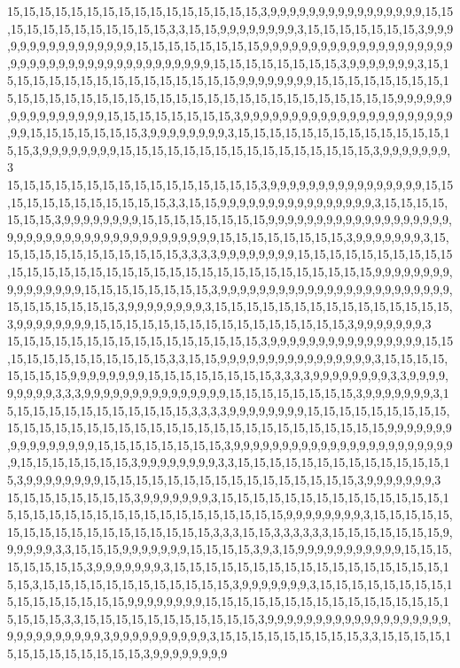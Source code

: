 15,15,15,15,15,15,15,15,15,15,15,15,15,15,15,15,3,9,9,9,9,9,9,9,9,9,9,9,9,9,9,9,9,15,15,15,15,15,15,15,15,15,15,15,15,3,3,15,15,9,9,9,9,9,9,9,9,3,15,15,15,15,15,15,15,3,9,9,9,9,9,9,9,9,9,9,9,9,9,9,9,9,15,15,15,15,15,15,15,15,9,9,9,9,9,9,9,9,9,9,9,9,9,9,9,9,9,9,9,9,9,9,9,9,9,9,9,9,9,9,9,9,9,9,9,9,9,9,9,9,9,15,15,15,15,15,15,15,15,3,9,9,9,9,9,9,9,3,15,15,15,15,15,15,15,15,15,15,15,15,15,15,15,15,9,9,9,9,9,9,9,9,15,15,15,15,15,15,15,15,15,15,15,15,15,15,15,15,15,15,15,15,15,15,15,15,15,15,15,15,15,15,15,15,15,9,9,9,9,9,9,9,9,9,9,9,9,9,9,9,9,15,15,15,15,15,15,15,15,3,9,9,9,9,9,9,9,9,9,9,9,9,9,9,9,9,9,9,9,9,9,9,9,9,15,15,15,15,15,15,15,3,9,9,9,9,9,9,9,9,3,15,15,15,15,15,15,15,15,15,15,15,15,15,15,15,3,9,9,9,9,9,9,9,9,15,15,15,15,15,15,15,15,15,15,15,15,15,15,15,15,3,9,9,9,9,9,9,9,3
15,15,15,15,15,15,15,15,15,15,15,15,15,15,15,15,3,9,9,9,9,9,9,9,9,9,9,9,9,9,9,9,9,15,15,15,15,15,15,15,15,15,15,15,15,3,3,15,15,9,9,9,9,9,9,9,9,9,9,9,9,9,9,9,9,3,15,15,15,15,15,15,15,3,9,9,9,9,9,9,9,9,15,15,15,15,15,15,15,15,9,9,9,9,9,9,9,9,9,9,9,9,9,9,9,9,9,9,9,9,9,9,9,9,9,9,9,9,9,9,9,9,9,9,9,9,9,9,9,9,9,15,15,15,15,15,15,15,15,3,9,9,9,9,9,9,9,3,15,15,15,15,15,15,15,15,15,15,15,15,3,3,3,3,9,9,9,9,9,9,9,9,15,15,15,15,15,15,15,15,15,15,15,15,15,15,15,15,15,15,15,15,15,15,15,15,15,15,15,15,15,15,15,15,15,9,9,9,9,9,9,9,9,9,9,9,9,9,9,9,9,15,15,15,15,15,15,15,15,3,9,9,9,9,9,9,9,9,9,9,9,9,9,9,9,9,9,9,9,9,9,9,9,9,15,15,15,15,15,15,15,3,9,9,9,9,9,9,9,9,3,15,15,15,15,15,15,15,15,15,15,15,15,15,15,15,3,9,9,9,9,9,9,9,9,15,15,15,15,15,15,15,15,15,15,15,15,15,15,15,15,3,9,9,9,9,9,9,9,3
15,15,15,15,15,15,15,15,15,15,15,15,15,15,15,15,3,9,9,9,9,9,9,9,9,9,9,9,9,9,9,9,9,15,15,15,15,15,15,15,15,15,15,15,15,3,3,15,15,9,9,9,9,9,9,9,9,9,9,9,9,9,9,9,9,3,15,15,15,15,15,15,15,15,9,9,9,9,9,9,9,9,15,15,15,15,15,15,15,15,3,3,3,3,9,9,9,9,9,9,9,9,3,3,9,9,9,9,9,9,9,9,9,3,3,3,9,9,9,9,9,9,9,9,9,9,9,9,9,9,9,15,15,15,15,15,15,15,15,3,9,9,9,9,9,9,9,3,15,15,15,15,15,15,15,15,15,15,15,15,3,3,3,3,9,9,9,9,9,9,9,9,15,15,15,15,15,15,15,15,15,15,15,15,15,15,15,15,15,15,15,15,15,15,15,15,15,15,15,15,15,15,15,15,15,9,9,9,9,9,9,9,9,9,9,9,9,9,9,9,9,15,15,15,15,15,15,15,15,3,9,9,9,9,9,9,9,9,9,9,9,9,9,9,9,9,9,9,9,9,9,9,9,9,15,15,15,15,15,15,15,3,9,9,9,9,9,9,9,9,3,3,15,15,15,15,15,15,15,15,15,15,15,15,15,15,3,9,9,9,9,9,9,9,9,15,15,15,15,15,15,15,15,15,15,15,15,15,15,15,15,3,9,9,9,9,9,9,9,3
15,15,15,15,15,15,15,15,3,9,9,9,9,9,9,9,3,15,15,15,15,15,15,15,15,15,15,15,15,15,15,15,15,15,15,15,15,15,15,15,15,15,15,15,15,15,15,15,15,9,9,9,9,9,9,9,9,3,15,15,15,15,15,15,15,15,15,15,15,15,15,15,15,15,15,15,3,3,3,15,15,3,3,3,3,3,3,15,15,15,15,15,15,15,9,9,9,9,9,9,3,3,15,15,15,9,9,9,9,9,9,9,15,15,15,15,3,9,3,15,9,9,9,9,9,9,9,9,9,9,9,15,15,15,15,15,15,15,15,3,9,9,9,9,9,9,9,3,15,15,15,15,15,15,15,15,15,15,15,15,15,15,15,15,15,15,15,3,15,15,15,15,15,15,15,15,15,15,15,15,3,9,9,9,9,9,9,9,3,15,15,15,15,15,15,15,15,15,15,15,15,15,15,15,15,9,9,9,9,9,9,9,9,15,15,15,15,15,15,15,15,15,15,15,15,15,15,15,15,15,15,15,3,3,15,15,15,15,15,15,15,15,15,15,15,3,9,9,9,9,9,9,9,9,9,9,9,9,9,9,9,9,9,9,9,9,9,9,9,9,9,9,9,9,9,3,9,9,9,9,9,9,9,9,9,9,3,15,15,15,15,15,15,15,15,15,3,3,15,15,15,15,15,15,15,15,15,15,15,15,15,3,9,9,9,9,9,9,9,9
